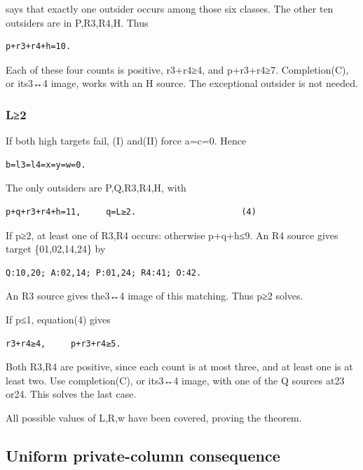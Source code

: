 \documentclass[
  10pt,
]{article}
\begin{document}
says that exactly one outsider occurs among those six classes. The other
ten outsiders are in P,R3,R4,H. Thus

\begin{verbatim}
p+r3+r4+h=10.
\end{verbatim}

Each of these four counts is positive, r3+r4≥4, and p+r3+r4≥7.
Completion(C), or its3↔4 image, works with an H source. The exceptional
outsider is not needed.

\hypertarget{l2}{%
\subsubsection*{L≥2}\label{l2}}

If both high targets fail, (I) and(II) force a=c=0. Hence

\begin{verbatim}
b=l3=l4=x=y=w=0.
\end{verbatim}

The only outsiders are P,Q,R3,R4,H, with

\begin{verbatim}
p+q+r3+r4+h=11,     q=L≥2.                     (4)
\end{verbatim}

If p≥2, at least one of R3,R4 occurs: otherwise p+q+h≤9. An R4 source
gives target \{01,02,14,24\} by

\begin{verbatim}
Q:10,20; A:02,14; P:01,24; R4:41; O:42.
\end{verbatim}

An R3 source gives the3↔4 image of this matching. Thus p≥2 solves.

If p≤1, equation(4) gives

\begin{verbatim}
r3+r4≥4,     p+r3+r4≥5.
\end{verbatim}

Both R3,R4 are positive, since each count is at most three, and at least
one is at least two. Use completion(C), or its3↔4 image, with one of the
Q sources at23 or24. This solves the last case.

All possible values of L,R,w have been covered, proving the theorem.

\hypertarget{uniform-private-column-consequence}{%
\subsection*{Uniform private-column
consequence}\label{uniform-private-column-consequence}}
\end{document}

